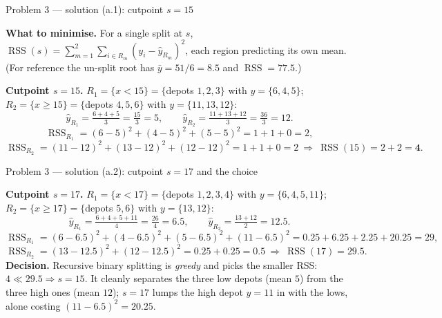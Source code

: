 \documentclass[aspectratio=169,11pt]{beamer}
\begin{document}
\begin{frame}{Problem 3 --- solution (a.1): cutpoint $s=15$}
  \begin{solutionbox}
    \textbf{What to minimise.} For a single split at $s$,
    $\operatorname{RSS}(s)=\sum_{m=1}^2\sum_{i\in R_m}(y_i-\hat y_{R_m})^2$, each region predicting
    its own mean. (For reference the un-split root has $\bar y=51/6=8.5$ and $\operatorname{RSS}=77.5$.)
    \medskip

    \textbf{Cutpoint $s=15$.} $R_1=\{x<15\}=\{$depots $1,2,3\}$ with $y=\{6,4,5\}$;
    $R_2=\{x\ge 15\}=\{$depots $4,5,6\}$ with $y=\{11,13,12\}$:
    \[
      \hat y_{R_1}=\tfrac{6+4+5}{3}=\tfrac{15}{3}=5,\qquad
      \hat y_{R_2}=\tfrac{11+13+12}{3}=\tfrac{36}{3}=12.
    \]
    \[
      \operatorname{RSS}_{R_1}=(6-5)^2+(4-5)^2+(5-5)^2=1+1+0=2,
    \]
    \[
      \operatorname{RSS}_{R_2}=(11-12)^2+(13-12)^2+(12-12)^2=1+1+0=2
      \ \Rightarrow\ \operatorname{RSS}(15)=2+2=\mathbf{4}.
    \]
  \end{solutionbox}
\end{frame}

\begin{frame}{Problem 3 --- solution (a.2): cutpoint $s=17$ and the choice}
  \begin{solutionbox}
    \textbf{Cutpoint $s=17$.} $R_1=\{x<17\}=\{$depots $1,2,3,4\}$ with $y=\{6,4,5,11\}$;
    $R_2=\{x\ge 17\}=\{$depots $5,6\}$ with $y=\{13,12\}$:
    \[
      \hat y_{R_1}=\tfrac{6+4+5+11}{4}=\tfrac{26}{4}=6.5,\qquad
      \hat y_{R_2}=\tfrac{13+12}{2}=12.5.
    \]
    \[
      \operatorname{RSS}_{R_1}=(6\!-\!6.5)^2+(4\!-\!6.5)^2+(5\!-\!6.5)^2+(11\!-\!6.5)^2=0.25+6.25+2.25+20.25=29,
    \]
    \[
      \operatorname{RSS}_{R_2}=(13-12.5)^2+(12-12.5)^2=0.25+0.25=0.5
      \ \Rightarrow\ \operatorname{RSS}(17)=\mathbf{29.5}.
    \]
    \textbf{Decision.} Recursive binary splitting is \emph{greedy} and picks the smaller RSS:
    $4\ll 29.5\Rightarrow\boxed{s=15}$. It cleanly separates the three low depots (mean $5$) from the
    three high ones (mean $12$); $s=17$ lumps the high depot $y=11$ in with the lows, alone costing
    $(11-6.5)^2=20.25$.
  \end{solutionbox}
\end{frame}
\end{document}
